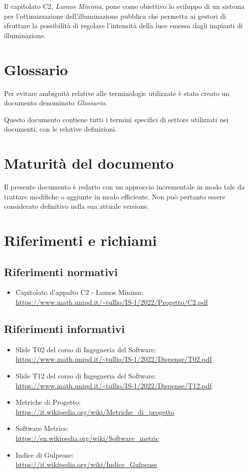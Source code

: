 Il capitolato C2, \textit{Lumos Minima}, pone come obiettivo lo sviluppo di un sistema per l'ottimizzazione dell'illuminazione pubblica che permetta ai gestori di sfruttare la possibilità di regolare l'intensità della luce emessa dagli impianti di illuminazione.

\section{Glossario}
Per evitare ambiguità relative alle terminologie utilizzate è stato creato un documento denominato \textit{Glossario}.

Questo documento contiene tutti i termini specifici di settore utilizzati nei documenti, con le relative definizioni.

\section{Maturità del documento}
Il presente documento è redatto con un approccio incrementale in modo tale da trattare modifiche o aggiunte in modo efficiente. Non può pertanto essere considerato definitivo nella sua attuale versione.

\section{Riferimenti e richiami}
\subsection{Riferimenti normativi}
\begin{itemize}
    \item Capitolato d'appalto C2 - Lumos Minima: \\ \url{https://www.math.unipd.it/~tullio/IS-1/2022/Progetto/C2.pdf}
\end{itemize}

\subsection{Riferimenti informativi}
\begin{itemize}
    \item Slide T02 del corso di Ingegneria del Software: \\ \url{https://www.math.unipd.it/~tullio/IS-1/2022/Dispense/T02.pdf}
    \item Slide T12 del corso di Ingegneria del Software: \\ \url{https://www.math.unipd.it/~tullio/IS-1/2022/Dispense/T12.pdf}
    \item Metriche di Progetto: \\ \url{https://it.wikipedia.org/wiki/Metriche_di_progetto}
    \item Software Metrics: \\ \url{https://en.wikipedia.org/wiki/Software_metric}
    \item Indice di Gulpease: \\ \url{https://it.wikipedia.org/wiki/Indice_Gulpease}
\end{itemize}